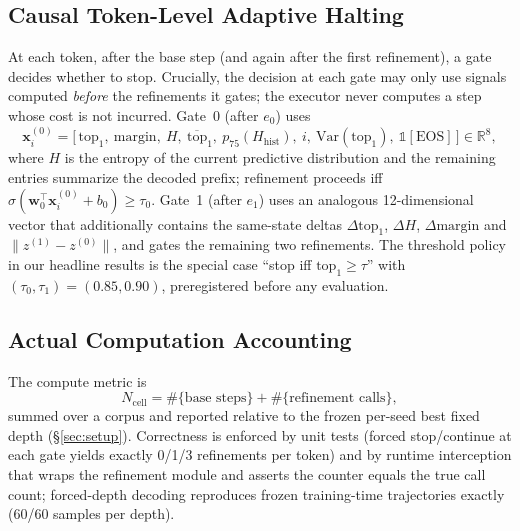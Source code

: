 \documentclass[11pt]{article}
\begin{document}
\subsection{Causal Token-Level Adaptive Halting}
\label{sec:halting}
At each token, after the base step (and again after the first refinement), a gate decides whether to stop. Crucially, the decision at each gate may only use signals computed \emph{before} the refinements it gates; the executor never computes a step whose cost is not incurred. Gate~0 (after $e_0$) uses
\begin{equation}
\mathbf{x}^{(0)}_i = \big[\,\mathrm{top}_1,\ \mathrm{margin},\ H,\ \overline{\mathrm{top}}_1,\ p_{75}(H_{\mathrm{hist}}),\ i,\ \mathrm{Var}(\mathrm{top}_1),\ \mathbb{1}[\mathrm{EOS}]\,\big] \in \mathbb{R}^8,
\label{eq:gate0}
\end{equation}
where $H$ is the entropy of the current predictive distribution and the remaining entries summarize the decoded prefix; refinement proceeds iff $\sigma(\mathbf{w}_0^\top \mathbf{x}^{(0)}_i + b_0) \geq \tau_0$. Gate~1 (after $e_1$) uses an analogous 12-dimensional vector that additionally contains the same-state deltas $\Delta\mathrm{top}_1$, $\Delta H$, $\Delta\mathrm{margin}$ and $\lVert z^{(1)}-z^{(0)}\rVert$, and gates the remaining two refinements. The threshold policy in our headline results is the special case ``stop iff $\mathrm{top}_1 \geq \tau$'' with $(\tau_0,\tau_1)=(0.85,0.90)$, preregistered before any evaluation.

\subsection{Actual Computation Accounting}
\label{sec:ncell}
The compute metric is
\begin{equation}
N_{\mathrm{cell}} = \#\{\text{base steps}\} + \#\{\text{refinement calls}\},
\label{eq:ncell}
\end{equation}
summed over a corpus and reported relative to the frozen per-seed best fixed depth (\S\ref{sec:setup}). Correctness is enforced by unit tests (forced stop/continue at each gate yields exactly 0/1/3 refinements per token) and by runtime interception that wraps the refinement module and asserts the counter equals the true call count; forced-depth decoding reproduces frozen training-time trajectories exactly (60/60 samples per depth).
\end{document}
